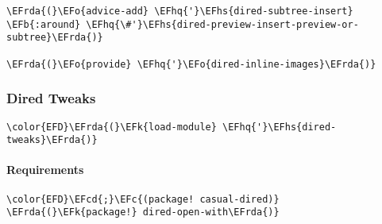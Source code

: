 \documentclass[a4wide,10pt]{article}
\newcommand{\EFc}[1]{\textcolor{EFc}{#1}} %
\newcommand{\EFcd}[1]{\textcolor{EFcd}{#1}} %
\newcommand{\EFk}[1]{\textcolor{EFk}{#1}} %
\newcommand{\EFb}[1]{\textcolor{EFb}{#1}} %
\newcommand{\EFo}[1]{\textcolor{EFo}{#1}} %
\newcommand{\EFhq}[1]{\textcolor{EFhq}{#1}} %
\newcommand{\EFhs}[1]{\textcolor{EFhs}{#1}} %
\newcommand{\EFrda}[1]{\textcolor{EFrda}{#1}} %
\begin{document}
\begin{Code}
\begin{Verbatim}
\EFrda{(}\EFo{advice-add} \EFhq{'}\EFhs{dired-subtree-insert} \EFb{:around} \EFhq{\#'}\EFhs{dired-preview-insert-preview-or-subtree}\EFrda{)}

\EFrda{(}\EFo{provide} \EFhq{'}\EFo{dired-inline-images}\EFrda{)}

\end{Verbatim}
\end{Code}
\subsubsection{Dired Tweaks}
\label{sec:orgefc4977}
\begin{Code}
\begin{Verbatim}
\color{EFD}\EFrda{(}\EFk{load-module} \EFhq{'}\EFhs{dired-tweaks}\EFrda{)}
\end{Verbatim}
\end{Code}
\paragraph{Requirements}
\label{sec:org27923a3}
\begin{Code}
\begin{Verbatim}
\color{EFD}\EFcd{;}\EFc{(package! casual-dired)}
\EFrda{(}\EFk{package!} dired-open-with\EFrda{)}
\end{Verbatim}
\end{Code}
\end{document}
